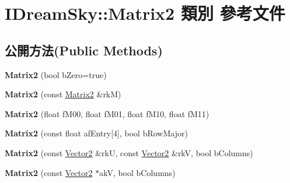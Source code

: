 \hypertarget{class_i_dream_sky_1_1_matrix2}{}\section{I\+Dream\+Sky\+:\+:Matrix2 類別 參考文件}
\label{class_i_dream_sky_1_1_matrix2}
\subsection*{公開方法(Public Methods)}
\begin{DoxyCompactItemize}
\item 
{\bfseries Matrix2} (bool b\+Zero=true)\hypertarget{class_i_dream_sky_1_1_matrix2_a6733e53b5064c91a4e829be0d26c0b15}{}\label{class_i_dream_sky_1_1_matrix2_a6733e53b5064c91a4e829be0d26c0b15}

\item 
{\bfseries Matrix2} (const \hyperlink{class_i_dream_sky_1_1_matrix2}{Matrix2} \&rkM)\hypertarget{class_i_dream_sky_1_1_matrix2_a10dfcf818e95a0fe0e6794e5840c6f41}{}\label{class_i_dream_sky_1_1_matrix2_a10dfcf818e95a0fe0e6794e5840c6f41}

\item 
{\bfseries Matrix2} (float f\+M00, float f\+M01, float f\+M10, float f\+M11)\hypertarget{class_i_dream_sky_1_1_matrix2_a2e99f42e0b760a4460df62dec26582f6}{}\label{class_i_dream_sky_1_1_matrix2_a2e99f42e0b760a4460df62dec26582f6}

\item 
{\bfseries Matrix2} (const float af\+Entry\mbox{[}4\mbox{]}, bool b\+Row\+Major)\hypertarget{class_i_dream_sky_1_1_matrix2_aa8afb2552644a486eb6bdae773e71d6e}{}\label{class_i_dream_sky_1_1_matrix2_aa8afb2552644a486eb6bdae773e71d6e}

\item 
{\bfseries Matrix2} (const \hyperlink{class_i_dream_sky_1_1_vector2}{Vector2} \&rkU, const \hyperlink{class_i_dream_sky_1_1_vector2}{Vector2} \&rkV, bool b\+Columns)\hypertarget{class_i_dream_sky_1_1_matrix2_afec5b244ff4c02a0c15e4876627433b1}{}\label{class_i_dream_sky_1_1_matrix2_afec5b244ff4c02a0c15e4876627433b1}

\item 
{\bfseries Matrix2} (const \hyperlink{class_i_dream_sky_1_1_vector2}{Vector2} $\ast$akV, bool b\+Columns)\hypertarget{class_i_dream_sky_1_1_matrix2_a247b4221354dec0e66305395d1a71635}{}\label{class_i_dream_sky_1_1_matrix2_a247b4221354dec0e66305395d1a71635}


\end{DoxyCompactItemize}
